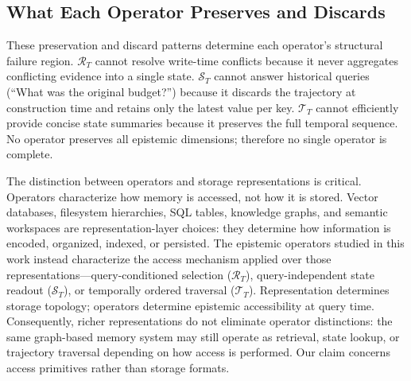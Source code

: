 \documentclass[letterpaper,twocolumn,10pt]{article}
\begin{document}
\subsection{What Each Operator Preserves and Discards}
\begin{table}[t]
\caption{Preserve/discard patterns.}
\centering
{}
\end{table}

These preservation and discard patterns determine each operator's structural failure region. $\mathcal{R}_T$ cannot resolve write-time conflicts because it never aggregates conflicting evidence into a single state. $\mathcal{S}_T$ cannot answer historical queries (``What was the original budget?'') because it discards the trajectory at construction time and retains only the latest value per key. $\mathcal{T}_T$ cannot efficiently provide concise state summaries because it preserves the full temporal sequence. No operator preserves all epistemic dimensions; therefore no single operator is complete.

The distinction between operators and storage representations is critical. Operators characterize how memory is accessed, not how it is stored. Vector databases, filesystem hierarchies, SQL tables, knowledge graphs, and semantic workspaces are representation-layer choices: they determine how information is encoded, organized, indexed, or persisted. The epistemic operators studied in this work instead characterize the access mechanism applied over those representations---query-conditioned selection ($\mathcal{R}_T$), query-independent state readout ($\mathcal{S}_T$), or temporally ordered traversal ($\mathcal{T}_T$). Representation determines storage topology; operators determine epistemic accessibility at query time. Consequently, richer representations do not eliminate operator distinctions: the same graph-based memory system may still operate as retrieval, state lookup, or trajectory traversal depending on how access is performed. Our claim concerns access primitives rather than storage formats.
\end{document}
